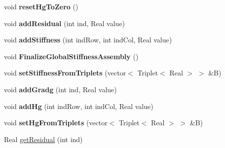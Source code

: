 \begin{DoxyCompactItemize}
\item 
\hypertarget{structvoom_1_1_eigen_elliptic_result_a429390f29e989f82af78c6ffe89d41f4}{
void {\bfseries resetHgToZero} ()}
\label{structvoom_1_1_eigen_elliptic_result_a429390f29e989f82af78c6ffe89d41f4}

\item 
\hypertarget{structvoom_1_1_eigen_elliptic_result_ac9b2d06f65ddb235e550078bc9f5a0d0}{
void {\bfseries addResidual} (int ind, Real value)}
\label{structvoom_1_1_eigen_elliptic_result_ac9b2d06f65ddb235e550078bc9f5a0d0}

\item 
\hypertarget{structvoom_1_1_eigen_elliptic_result_ab9cafe285c4d4abc4dccce3a1ed034a0}{
void {\bfseries addStiffness} (int indRow, int indCol, Real value)}
\label{structvoom_1_1_eigen_elliptic_result_ab9cafe285c4d4abc4dccce3a1ed034a0}

\item 
\hypertarget{structvoom_1_1_eigen_elliptic_result_a9cdefa63c233eda1136b25f278307fff}{
void {\bfseries FinalizeGlobalStiffnessAssembly} ()}
\label{structvoom_1_1_eigen_elliptic_result_a9cdefa63c233eda1136b25f278307fff}

\item 
\hypertarget{structvoom_1_1_eigen_elliptic_result_aeafd057e2864192ef851522f3455da3e}{
void {\bfseries setStiffnessFromTriplets} (vector$<$ Triplet$<$ Real $>$ $>$ \&B)}
\label{structvoom_1_1_eigen_elliptic_result_aeafd057e2864192ef851522f3455da3e}

\item 
\hypertarget{structvoom_1_1_eigen_elliptic_result_a7f0038dfd5e5add819ff312543c56e4a}{
void {\bfseries addGradg} (int ind, Real value)}
\label{structvoom_1_1_eigen_elliptic_result_a7f0038dfd5e5add819ff312543c56e4a}

\item 
\hypertarget{structvoom_1_1_eigen_elliptic_result_a4aef4d218df7228df8c812f027496fd7}{
void {\bfseries addHg} (int indRow, int indCol, Real value)}
\label{structvoom_1_1_eigen_elliptic_result_a4aef4d218df7228df8c812f027496fd7}

\item 
\hypertarget{structvoom_1_1_eigen_elliptic_result_a50c77f1b26e45ce4627ac1060b83a456}{
void {\bfseries setHgFromTriplets} (vector$<$ Triplet$<$ Real $>$ $>$ \&B)}
\label{structvoom_1_1_eigen_elliptic_result_a50c77f1b26e45ce4627ac1060b83a456}

\item 
\hypertarget{structvoom_1_1_eigen_elliptic_result_a45599f5067cc01cb09b56ceb348a3788}{
Real \hyperlink{structvoom_1_1_eigen_elliptic_result_a45599f5067cc01cb09b56ceb348a3788}{getResidual} (int ind)}
\label{structvoom_1_1_eigen_elliptic_result_a45599f5067cc01cb09b56ceb348a3788}


\end{DoxyCompactItemize}
